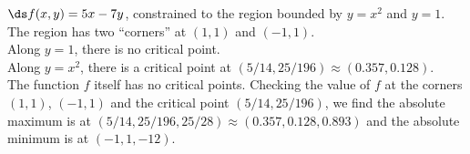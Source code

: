 {$\ds f(x,y) = 5x-7y$, constrained to the region bounded by $y=x^2$ and $y=1$.
}
{The region has two ``corners'' at $(1,1)$ and $(-1,1)$.\\
Along $y=1$, there is no critical point.\\
Along $y=x^2$, there is a critical point at $(5/14,25/196)\approx (0.357,0.128) $.\\
The function $f$ itself has no critical points.
Checking the value of $f$ at the corners $(1,1)$, $(-1,1)$ and the critical point $(5/14,25/196)$, we find the absolute maximum is at $(5/14,25/196,25/28) \approx (0.357,0.128,0.893)$ and the absolute minimum is at $(-1,1,-12)$.
}